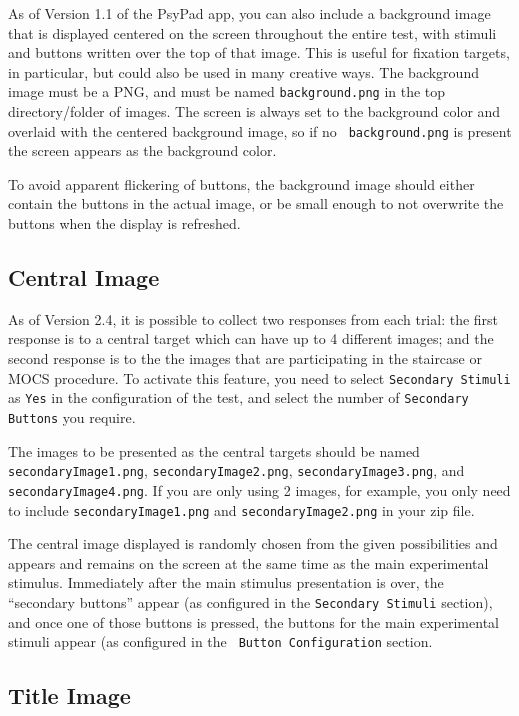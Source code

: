 \documentclass{article}
\begin{document}
As of Version 1.1 of the PsyPad app, you can also include a background
image that is displayed centered on the screen throughout the entire
test, with stimuli and buttons written over the top of that image.
This is useful for fixation targets, in particular, but could also
be used in many creative ways.  The background image must be a PNG,
and must be named {\tt background.png} in the top directory/folder
of images.  The screen is always set to the background color and
overlaid with the centered background image, so if no {\tt
background.png} is present the screen appears as the background
color.

To avoid apparent flickering of buttons, the background image should
either contain the buttons in the actual image, or be small enough
to not overwrite the buttons when the display is refreshed.


\subsection{Central Image}
\label{sect-second}

As of Version 2.4, it is possible to collect two responses from each trial: the
first response is to a central target which can have up to 4 different images; 
and the second response is to
the the images that are participating in the staircase or MOCS procedure. 
To activate this feature, you need to select {\tt Secondary Stimuli} as {\tt Yes}
in the configuration of the test, and select the number of {\tt Secondary Buttons}
you require.


The images to be presented as the central targets should be named 
{\tt secondaryImage1.png},
{\tt secondaryImage2.png},
{\tt secondaryImage3.png}, and 
{\tt secondaryImage4.png}. 
If you are only using 2 images, for example, you only need to include
{\tt secondaryImage1.png} and {\tt secondaryImage2.png} in your zip file.


The central image displayed is randomly chosen from the given possibilities
and appears and remains on the screen at the same time as the main experimental
stimulus.
Immediately after the main stimulus presentation is over, the ``secondary
buttons'' appear (as configured in the {\tt Secondary Stimuli} section), 
and once one of those buttons is pressed, 
the buttons for the main experimental stimuli appear (as configured in the {\tt
Button Configuration} section.



\subsection{Title  Image}
\label{sect-ti}
\end{document}
